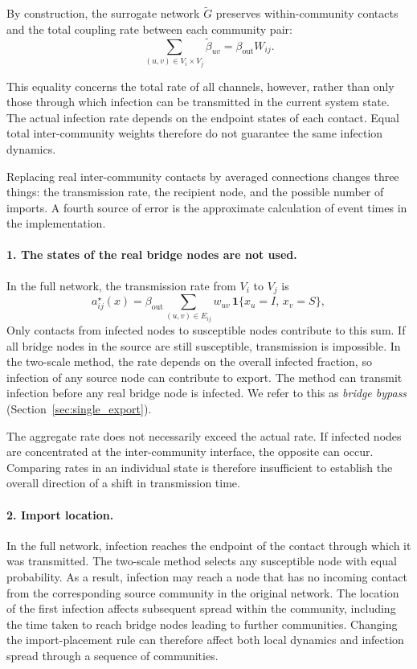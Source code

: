 \documentclass{ieeeaccess}
\newcommand{\ind}{\mathbf{1}}
\begin{document}
By construction, the surrogate network $\tilde G$ preserves within-community contacts and the total coupling rate between each community pair:
\[
\sum_{(u,v)\in V_i\times V_j}\tilde\beta_{uv}
=
\beta_{\mathrm{out}}W_{ij}.
\]

This equality concerns the total rate of all channels, however, rather than only those through which infection can be transmitted in the current system state. The actual infection rate depends on the endpoint states of each contact. Equal total inter-community weights therefore do not guarantee the same infection dynamics.

Replacing real inter-community contacts by averaged connections changes three things: the transmission rate, the recipient node, and the possible number of imports. A fourth source of error is the approximate calculation of event times in the implementation.

\paragraph{1. The states of the real bridge nodes are not used.}
In the full network, the transmission rate from $V_i$ to $V_j$ is
\begin{equation}
\label{eq:exact_rate}
a^\star_{ij}(x)=\beta_{\mathrm{out}}\sum_{(u,v)\in E_{ij}}w_{uv}\,\ind\{x_u=I,\,x_v=S\},
\end{equation}
Only contacts from infected nodes to susceptible nodes contribute to this sum. If all bridge nodes in the source are still susceptible, transmission is impossible. In the two-scale method, the rate depends on the overall infected fraction, so infection of any source node can contribute to export. The method can transmit infection before any real bridge node is infected. We refer to this as \emph{bridge bypass} (Section~\ref{sec:single_export}).

The aggregate rate does not necessarily exceed the actual rate. If infected nodes are concentrated at the inter-community interface, the opposite can occur. Comparing rates in an individual state is therefore insufficient to establish the overall direction of a shift in transmission time.

\paragraph{2. Import location.}
In the full network, infection reaches the endpoint of the contact through which it was transmitted. The two-scale method selects any susceptible node with equal probability.
As a result, infection may reach a node that has no incoming contact from the corresponding source community in the original network. The location of the first infection affects subsequent spread within the community, including the time taken to reach bridge nodes leading to further communities. Changing the import-placement rule can therefore affect both local dynamics and infection spread through a sequence of communities.
\end{document}
